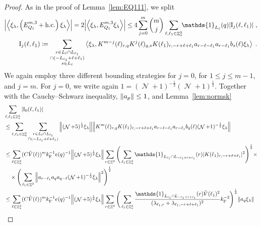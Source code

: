 \documentclass[12pt,a4paper]{article}
\numberwithin{equation}{section}
\newcommand{\1}{\mathbb{I}}
\newcommand{\F}{\mathrm{F}}
\newcommand{\I}{\mathrm{I}}
\DeclareMathOperator{\Z}{\mathbb{Z}}
\DeclareMathOperator{\NN}{\mathcal{N}}
\newcommand{\half}{\frac{1}{2}}
\newcommand{\eva}[1]{\left\langle #1 \right\rangle}
\theoremstyle{plain}
\theoremstyle{definition}
\theoremstyle{remark}
\theoremstyle{plain}
\theoremstyle{definition}
\theoremstyle{remark}
\begin{document}
\begin{proof}
As in the proof of Lemma~\ref{lem:EQ111}, we split
\begin{equation} \label{eq:EQ1121}
\begin{aligned}
	\abs{\eva{\xi_\lambda,\left(E^{m,3}_{Q_1}+\mathrm{h.c.}\right) \xi_\lambda }} 
	= 2\abs{\eva{\xi_\lambda, E^{m,3}_{Q_1} \xi_\lambda }}
	\le 4 \sum_{j=0}^m {{m}\choose j} \sum\limits_{\ell,\ell_1 \in \Z^3_*}\!\! \mathds{1}_{L_\ell}(q) |\I_j(\ell, \ell_1)| \;,\\
	\I_j(\ell, \ell_1)
	\coloneq \sum\limits_{\substack{r\in L_{\ell} \cap L_{\ell_1}\\ \cap (-L_{\ell_1}+\ell+\ell_1)\\ s \in L_{\ell}}} 
		\eva{\xi_\lambda, K^{m-j}(\ell)_{r,q} K^{j}(\ell)_{q,s}K(\ell_1)_{r,-r+\ell+\ell_1} a_{r-\ell-\ell_1} a_{r-\ell_1} b_{s}(\ell) \xi_\lambda} \;. \\
\end{aligned}
\end{equation}
We again employ three different bounding strategies for $ j = 0 $, for $ 1 \le j \le m-1 $, and $ j = m $. For $ j = 0 $, we write again $1 = (\NN+1)^{-\half}(\NN+1)^{\half}$. Together with the Cauchy--Schwarz inequality, $ \norm{a_p} \le 1 $, and Lemma~\ref{lem:normsk}
\textcolor{green!30!black}{
\begin{align}
	&\sum_{\ell,\ell_1 \in \Z^3_*} |\I_0(\ell, \ell_1)| \nonumber\\
	&\leq \sum_{\ell,\ell_1 \in \Z^3_*} \sum\limits_{\substack{r\in L_{\ell} \cap L_{\ell_1}\\ \cap (-L_{\ell_1}+\ell+\ell_1)}} \norm{ (\NN+5)^{\half} \xi_\lambda} \norm{ K^m(\ell )_{r,q} K(\ell_1)_{r,-r+\ell+\ell_1} a_{r-\ell-\ell_1} a_{r-\ell_1} b_{q}(\ell) (\NN+1)^{-\half} \xi_\lambda }\nonumber\\
	 &\leq \sum_{\ell \in \Z^3_*} (C \hat{V}(\ell))^m k_{\F}^{-1} e(q)^{-1}
	 	\norm{ (\NN+5)^{\half} \xi_\lambda}
	 	\sum_{r \in \Z^3} \Bigg( \sum_{\ell_1 \in \Z^3_*} \mathds{1}_{L_{\ell_1} \cap L_{-\ell_1+\ell+\ell_1}}(r) |K(\ell_1)_{r,-r+\ell+\ell_1}|^2 \Bigg)^{\half} \times \nonumber\\
	 &\quad \times \Bigg( \sum\limits_{\ell_1 \in \Z^3} \norm{ a_{r-\ell_1} a_q a_{q-\ell} (\NN+1)^{-\half} \xi_\lambda }^2 \Bigg)^\half \nonumber\\
	 &\leq \sum_{\ell \in \Z^3_*} (C \hat{V}(\ell))^m k_{\F}^{-1} e(q)^{-1}
	 	\norm{ (\NN+5)^{\half} \xi_\lambda}
	 	\sum_{r \in \Z^3} \Bigg( \sum_{\ell_1 \in \Z^3_*} \frac{\mathds{1}_{L_{\ell_1} \cap L_{-\ell_1+\ell+\ell_1}}(r) \hat{V}(\ell_1)^2}{(\lambda_{\ell_1,r} + \lambda_{\ell_1,-r+\ell+\ell_1})^2} k_{\F}^{-2} \Bigg)^{\half} \norm{ a_q \xi_\lambda } \nonumber\\

\end{align}}
\end{proof}
\end{document}
